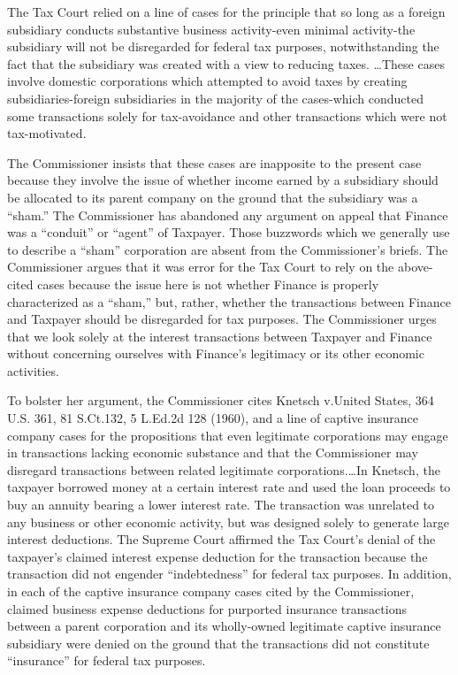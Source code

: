 \begin{select}
The Tax Court relied on a line of cases for the principle that so long as a foreign subsidiary conducts substantive business activity-even minimal activity-the subsidiary will not be disregarded for federal tax purposes, notwithstanding the fact that the subsidiary was created with a view to reducing taxes.  \ldots These cases involve domestic corporations which attempted to avoid taxes by creating subsidiaries-foreign subsidiaries in the majority of the cases-which conducted some transactions solely for tax-avoidance and other transactions which were not tax-motivated.

The Commissioner insists that these cases are inapposite to the present case because they involve the issue of whether income earned by a subsidiary should be allocated to its parent company on the ground that the subsidiary was a ``sham.''  The Commissioner has abandoned any argument on appeal that Finance was a ``conduit'' or ``agent'' of Taxpayer. Those buzzwords which we generally use to describe a ``sham'' corporation are absent from the Commissioner's briefs. The Commissioner argues that it was error for the Tax Court to rely on the above-cited cases because the issue here is not whether Finance is properly characterized as a ``sham,'' but, rather, whether the transactions between Finance and Taxpayer should be disregarded for tax purposes. The Commissioner urges that we look solely at the interest transactions between Taxpayer and Finance without concerning ourselves with Finance's legitimacy or its other economic activities.

To bolster her argument, the Commissioner cites Knetsch v.\@ United States, 364 U.S. 361, 81 S.Ct.\@ 132, 5 L.Ed.2d 128 (1960), and a line of captive insurance company cases for the propositions that even legitimate corporations may engage in transactions lacking economic substance and that the Commissioner may disregard transactions between related legitimate corporations.\ldots In Knetsch, the taxpayer borrowed money at a certain interest rate and used the loan proceeds to buy an annuity bearing a lower interest rate. The transaction was unrelated to any business or other economic activity, but was designed solely to generate large interest deductions. The Supreme Court affirmed the Tax Court's denial of the taxpayer's claimed interest expense deduction for the transaction because the transaction did not engender ``indebtedness'' for federal tax purposes. In addition, in each of the captive insurance company cases cited by the Commissioner, claimed business expense deductions for purported insurance transactions between a parent corporation and its wholly-owned legitimate captive insurance subsidiary were denied on the ground that the transactions did not constitute ``insurance'' for federal tax purposes.


\end{select}
